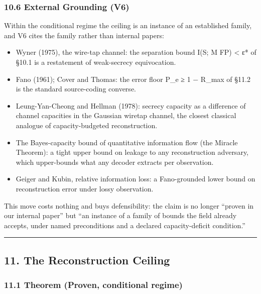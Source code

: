 \documentclass[
  11pt,
]{article}
\providecommand{\tightlist}{%
  \setlength{\itemsep}{0pt}\setlength{\parskip}{0pt}}
\begin{document}
\subsubsection{10.6 External Grounding
(V6)}\label{external-grounding-v6}

Within the conditional regime the ceiling is an instance of an
established family, and V6 cites the family rather than internal papers:

\begin{itemize}
\tightlist
\item
  Wyner (1975), the wire-tap channel: the separation bound I(S; M
  \textbar{} FP) \textless{} ε* of §10.1 is a restatement of
  weak-secrecy equivocation.
\item
  Fano (1961); Cover and Thomas: the error floor P\_e ≥ 1 − R\_max of
  §11.2 is the standard source-coding converse.
\item
  Leung-Yan-Cheong and Hellman (1978): secrecy capacity as a difference
  of channel capacities in the Gaussian wiretap channel, the closest
  classical analogue of capacity-budgeted reconstruction.
\item
  The Bayes-capacity bound of quantitative information flow (the Miracle
  Theorem): a tight upper bound on leakage to any reconstruction
  adversary, which upper-bounds what any decoder extracts per
  observation.
\item
  Geiger and Kubin, relative information loss: a Fano-grounded lower
  bound on reconstruction error under lossy observation.
\end{itemize}

This move costs nothing and buys defensibility: the claim is no longer
``proven in our internal paper'' but ``an instance of a family of bounds
the field already accepts, under named preconditions and a declared
capacity-deficit condition.''

\begin{center}\rule{0.5\linewidth}{0.5pt}\end{center}

\subsection{11. The Reconstruction
Ceiling}\label{the-reconstruction-ceiling}

\subsubsection{11.1 Theorem (Proven, conditional
regime)}\label{theorem-proven-conditional-regime}
\end{document}
